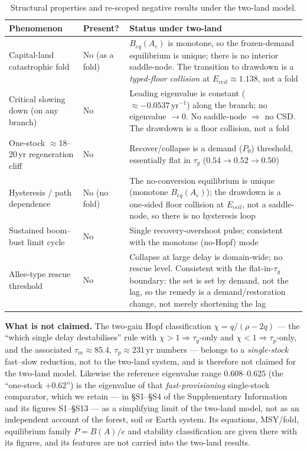 \documentclass[11pt]{article}
\begin{document}
\begin{table}[htbp]
\centering
\small
\begin{tabularx}{\textwidth}{>{\raggedright\arraybackslash}X>{\raggedright\arraybackslash}X>{\raggedright\arraybackslash}X}
\toprule
Phenomenon & Present? & Status under two-land \\
\midrule
Capital-land catastrophic fold & No (as a fold) & $B_{eq}(A_c)$ is monotone, so the frozen-demand equilibrium is unique; there is no interior saddle-node. The transition to drawdown is a \emph{typed-floor collision} at $E_{ceil}\approx1.138$, not a fold \\
Critical slowing down (on any branch) & No & Leading eigenvalue is constant ($\approx-0.0537\,\text{yr}^{-1}$) along the branch; no eigenvalue $\to0$. No saddle-node $\Rightarrow$ no CSD. The drawdown is a floor collision, not a fold \\
One-stock $\approx$18--20\,yr regeneration cliff & No & Recover/collapse is a demand ($P_0$) threshold, essentially flat in $\tau_g$ ($0.54\to0.52\to0.50$) \\
Hysteresis / path dependence & No (no fold) & The no-conversion equilibrium is unique (monotone $B_{eq}(A_c)$); the drawdown is a one-sided floor collision at $E_{ceil}$, not a saddle-node, so there is no hysteresis loop \\
Sustained boom--bust limit cycle & No & Single recovery-overshoot pulse; consistent with the monotone (no-Hopf) mode \\
Allee-type rescue threshold & No & Collapse at large delay is domain-wide; no rescue level. Consistent with the flat-in-$\tau_g$ boundary: the set is set by demand, not the lag, so the remedy is a demand/restoration change, not merely shortening the lag \\
\bottomrule
\end{tabularx}
\caption{Structural properties and re-scoped negative results under the two-land model.}
\label{tab:neg}
\end{table}

\noindent\textbf{What is not claimed.} The two-gain Hopf classification $\chi=q/(\rho-2q)$ --- the ``which
single delay destabilises'' rule with $\chi>1\Rightarrow\tau_g$-only and $\chi<1\Rightarrow\tau_p$-only, and the
associated $\tau_m\approx85.4$, $\tau_p\approx231$\,yr numbers --- belongs to a \emph{single-stock} fast--slow
reduction, not to the two-land system, and is therefore not claimed for the two-land model. Likewise the
reference eigenvalue range $0.608$--$0.625$ (the ``one-stock $+0.62$'') is the eigenvalue of that
\emph{fast-provisioning} single-stock comparator, which we retain --- in \S S1--\S S4 of the Supplementary
Information and its figures S1--\S S13 --- as a simplifying limit of the two-land model, not as an
independent account of the forest, soil or Earth system. Its equations, MSY/fold, equilibrium family $P=B(A)/e$ and stability classification are given there with its figures, and its features are not carried into the two-land results.
\end{document}
